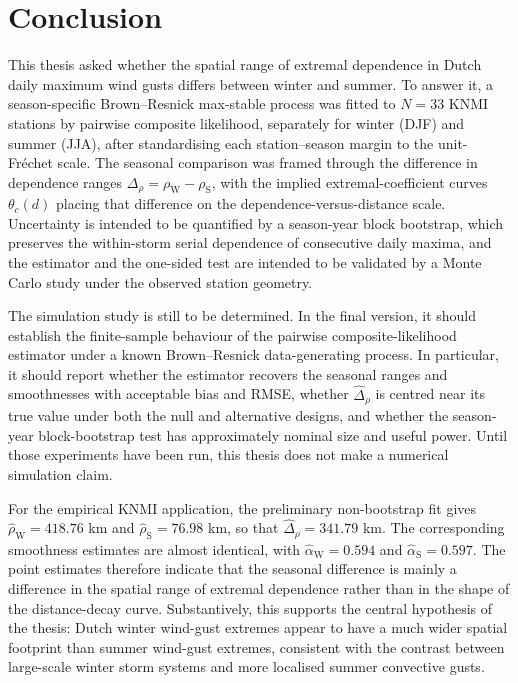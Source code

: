 \section{Conclusion}\label{sec:conclusion}

This thesis asked whether the spatial range of extremal dependence in Dutch daily maximum wind gusts differs between winter and summer. To answer it, a season-specific Brown--Resnick max-stable process was fitted to \(N=33\) KNMI stations by pairwise composite likelihood, separately for winter (DJF) and summer (JJA), after standardising each station--season margin to the unit-Fr\'echet scale. The seasonal comparison was framed through the difference in dependence ranges \(\Delta_\rho=\rho_{\mathrm W}-\rho_{\mathrm S}\), with the implied extremal-coefficient curves \(\theta_c(d)\) placing that difference on the dependence-versus-distance scale. Uncertainty is intended to be quantified by a season-year block bootstrap, which preserves the within-storm serial dependence of consecutive daily maxima, and the estimator and the one-sided test are intended to be validated by a Monte Carlo study under the observed station geometry.

The simulation study is still to be determined. In the final version, it should establish the finite-sample behaviour of the pairwise composite-likelihood estimator under a known Brown--Resnick data-generating process. In particular, it should report whether the estimator recovers the seasonal ranges and smoothnesses with acceptable bias and RMSE, whether \(\widehat\Delta_\rho\) is centred near its true value under both the null and alternative designs, and whether the season-year block-bootstrap test has approximately nominal size and useful power. Until those experiments have been run, this thesis does not make a numerical simulation claim.

For the empirical KNMI application, the preliminary non-bootstrap fit gives \(\widehat\rho_{\mathrm W}=418.76\) km and \(\widehat\rho_{\mathrm S}=76.98\) km, so that \(\widehat\Delta_\rho=341.79\) km. The corresponding smoothness estimates are almost identical, with \(\widehat\alpha_{\mathrm W}=0.594\) and \(\widehat\alpha_{\mathrm S}=0.597\). The point estimates therefore indicate that the seasonal difference is mainly a difference in the spatial range of extremal dependence rather than in the shape of the distance-decay curve. Substantively, this supports the central hypothesis of the thesis: Dutch winter wind-gust extremes appear to have a much wider spatial footprint than summer wind-gust extremes, consistent with the contrast between large-scale winter storm systems and more localised summer convective gusts.

